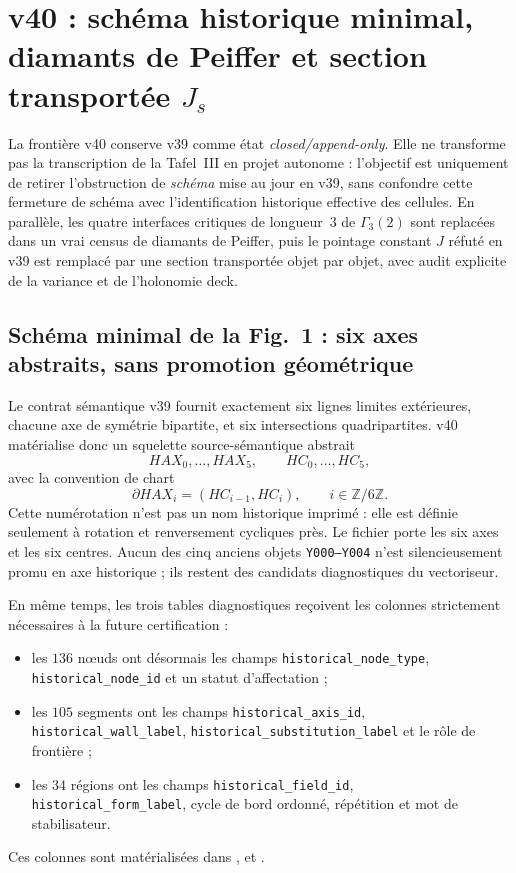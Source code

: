 \documentclass[11pt,a4paper]{article}
\begin{document}
\section{v40 : schéma historique minimal, diamants de Peiffer et section transportée $J_s$}\label{sec:v40-schema-peiffer-J}

La frontière v40 conserve v39 comme état \emph{closed/append-only}. Elle ne transforme pas la transcription de la Tafel~III en projet autonome : l'objectif est uniquement de retirer l'obstruction de \emph{schéma} mise au jour en v39, sans confondre cette fermeture de schéma avec l'identification historique effective des cellules. En parallèle, les quatre interfaces critiques de longueur~$3$ de $\Gamma_3(2)$ sont replacées dans un vrai census de diamants de Peiffer, puis le pointage constant $J$ réfuté en v39 est remplacé par une section transportée objet par objet, avec audit explicite de la variance et de l'holonomie deck.

\subsection{Schéma minimal de la Fig.~1 : six axes abstraits, sans promotion géométrique}

Le contrat sémantique v39 fournit exactement six lignes limites extérieures, chacune axe de symétrie bipartite, et six intersections quadripartites. v40 matérialise donc un squelette source-sémantique abstrait
\[
  HAX_0,\ldots,HAX_5,
  \qquad
  HC_0,\ldots,HC_5,
\]
avec la convention de chart
\[
 \partial HAX_i=(HC_{i-1},HC_i),
 \qquad i\in\mathbb Z/6\mathbb Z.
\]
Cette numérotation n'est pas un nom historique imprimé : elle est définie seulement à rotation et renversement cycliques près. Le fichier  porte les six axes et  les six centres. Aucun des cinq anciens objets \texttt{Y000--Y004} n'est silencieusement promu en axe historique ; ils restent des candidats diagnostiques du vectoriseur.

En même temps, les trois tables diagnostiques reçoivent les colonnes strictement nécessaires à la future certification :
\begin{itemize}
\item les $136$ nœuds ont désormais les champs \texttt{historical\_node\_type}, \texttt{historical\_node\_id} et un statut d'affectation ;
\item les $105$ segments ont les champs \texttt{historical\_axis\_id}, \texttt{historical\_wall\_label}, \texttt{historical\_substitution\_label} et le rôle de frontière ;
\item les $34$ régions ont les champs \texttt{historical\_field\_id}, \texttt{historical\_form\_label}, cycle de bord ordonné, répétition et mot de stabilisateur.
\end{itemize}
Ces colonnes sont matérialisées dans ,  et .
\end{document}

